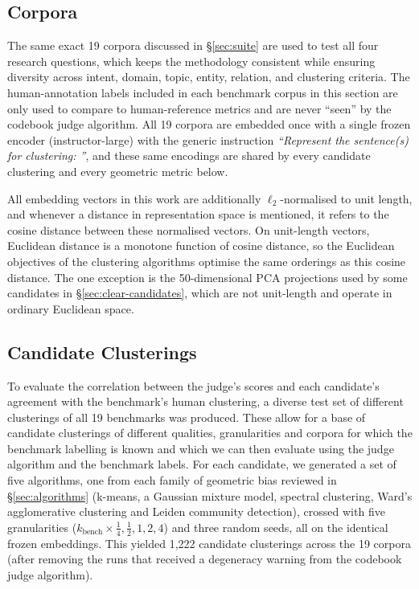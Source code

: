 \documentclass[11pt,a4paper,oneside]{report}
\begin{document}
\subsection{Corpora}

The same exact 19 corpora discussed in \S\ref{sec:suite} are used to test all four research questions, which keeps the methodology consistent while ensuring diversity across intent, domain, topic, entity, relation, and clustering criteria. The human-annotation labels included in each benchmark corpus in this section are only used to compare to human-reference metrics and are never ``seen'' by the codebook judge algorithm. All 19 corpora are embedded once with a single frozen encoder ({\small\ttfamily instructor-large}) with the generic instruction \emph{``Represent the sentence(s) for clustering: ''}, and these same encodings are shared by every candidate clustering and every geometric metric below.

All embedding vectors in this work are additionally $\ell_2$-normalised to unit length, and whenever a distance in representation space is mentioned, it refers to the cosine distance between these normalised vectors. On unit-length vectors, Euclidean distance is a monotone function of cosine distance, so the Euclidean objectives of the clustering algorithms optimise the same orderings as this cosine distance. The one exception is the 50-dimensional PCA projections used by some candidates in \S\ref{sec:clear-candidates}, which are not unit-length and operate in ordinary Euclidean space.

\subsection{Candidate Clusterings}

To evaluate the correlation between the judge's scores and each candidate's agreement with the benchmark's human clustering, a diverse test set of different clusterings of all 19 benchmarks was produced. These allow for a base of candidate clusterings of different qualities, granularities and corpora for which the benchmark labelling is known and which we can then evaluate using the judge algorithm and the benchmark labels. For each candidate, we generated a set of five algorithms, one from each family of geometric bias reviewed in \S\ref{sec:algorithms} (k-means, a Gaussian mixture model, spectral clustering, Ward's agglomerative clustering and Leiden community detection), crossed with five granularities ($k_{\mathrm{bench}} \times \tfrac14, \tfrac12, 1, 2, 4$) and three random seeds, all on the identical frozen embeddings. This yielded 1{,}222 candidate clusterings across the 19 corpora (after removing the runs that received a degeneracy warning from the codebook judge algorithm).
\end{document}
